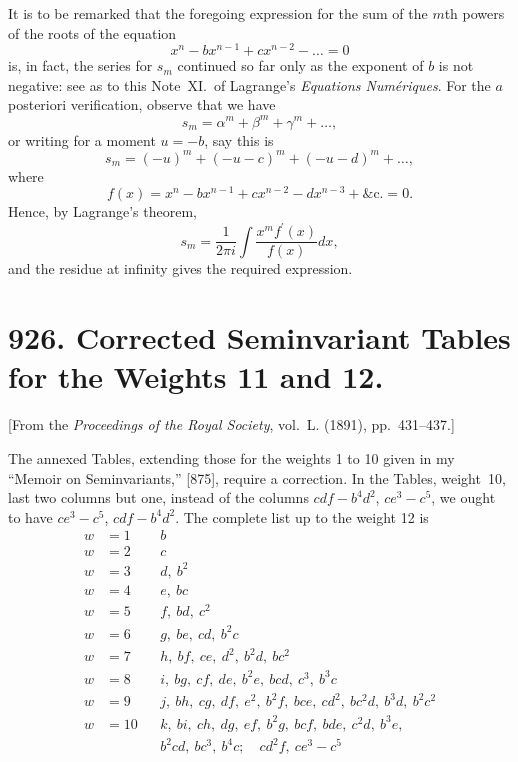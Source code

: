 \documentclass[12pt,a4paper]{article}
\begin{document}
It is to be remarked that the foregoing expression for the sum of the $m$th
powers of the roots of the equation
\[
x^n - bx^{n-1} + cx^{n-2} - \ldots = 0
\]
is, in fact, the series for $s_m$ continued so far only as the exponent of $b$ is not
negative: see as to this Note~XI.~of Lagrange's \textit{Equations Num\'eriques}. For the $a$
posteriori verification, observe that we have
\[
s_m = \alpha^m + \beta^m + \gamma^m + \ldots,
\]
or writing for a moment $u = -b$, say this is
\[
s_m = (-u)^m + (-u - c)^m + (-u - d)^m + \ldots,
\]
where
\[
f(x) = x^n - bx^{n-1} + cx^{n-2} - dx^{n-3} + \&\text{c.} = 0.
\]
Hence, by Lagrange's theorem,
\[
s_m = \frac{1}{2\pi i} \int \frac{x^m f^\prime(x)}{f(x)} dx,
\]
and the residue at infinity gives the required expression.



\newpage
\section*{926. Corrected Seminvariant Tables for the Weights 11 and 12.}

[From the \textit{Proceedings of the Royal Society}, vol.~L. (1891), pp.~431--437.]

\bigskip

The annexed Tables, extending those for the weights 1 to 10 given in my
``Memoir on Seminvariants,'' [875], require a correction. In the Tables, weight~10,
last two columns but one, instead of the columns $cdf - b^4d^2$, $ce^3 - c^5$, we ought to have
$ce^3 - c^5$, $cdf - b^4d^2$. The complete list up to the weight 12 is
\begin{align*}
w &= 1 && b\\
w &= 2 && c\\
w &= 3 && d,\ b^2\\
w &= 4 && e,\ bc\\
w &= 5 && f,\ bd,\ c^2\\
w &= 6 && g,\ be,\ cd,\ b^2c\\
w &= 7 && h,\ bf,\ ce,\ d^2,\ b^2d,\ bc^2\\
w &= 8 && i,\ bg,\ cf,\ de,\ b^2e,\ bcd,\ c^3,\ b^3c\\
w &= 9 && j,\ bh,\ cg,\ df,\ e^2,\ b^2f,\ bce,\ cd^2,\ bc^2d,\ b^3d,\ b^2c^2\\
w &= 10 && k,\ bi,\ ch,\ dg,\ ef,\ b^2g,\ bcf,\ bde,\ c^2d,\ b^3e,\\
&&& b^2cd,\ bc^3,\ b^4c;\quad cd^2f,\ ce^3 - c^5
\end{align*}
\end{document}
